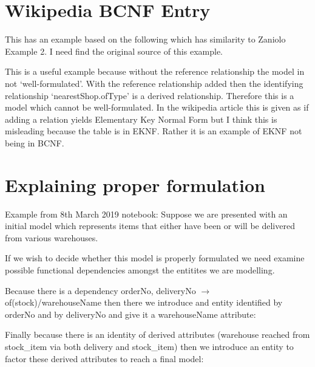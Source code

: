 \documentclass[11pt,a4paper]{scrartcl}
\renewcommand{\erpictureFolder}[0]{../SharedPictures}
\begin{document}
\section{Wikipedia BCNF Entry}
This has an example based on the following which has similarity to Zaniolo Example 2.
I need find the original source of this example.
\begin{center}

\end{center}
This is a useful example because without the reference relationship the model in not `well-formulated'. With the reference relationship added
then the identifying relationship `nearestShop.ofType' is a derived relationship. Therefore this is a model which cannot be well-formulated.
In the wikipedia article this is given as if adding a relation yields Elementary Key Normal Form but I think this is misleading because 
the table is in EKNF. Rather it is an example of EKNF not being in BCNF.
\newpage
\section{Explaining proper formulation}
Example from 8th March 2019 notebook:
Suppose we are presented with an  initial model which represents items that either have been or will be delivered from various warehouses.

\begin{center}

\end{center}

If we wish to decide whether this model is properly formulated we need  examine possible functional dependencies amongst the entitites
we are modelling. 

Because there is a dependency orderNo, deliveryNo $\longrightarrow$  of(stock)/warehouseName 
then there we introduce and  entity identified by orderNo and by deliveryNo and give it a warehouseName attribute:
\begin{center}

\end{center}
Finally because there is an identity of derived attributes (warehouse reached from stock\_item via both delivery and stock\_item) then
we introduce an entity to factor these derived attributes to reach a final model:


\begin{center}

\end{center}
\newpage
 

\end{document}
